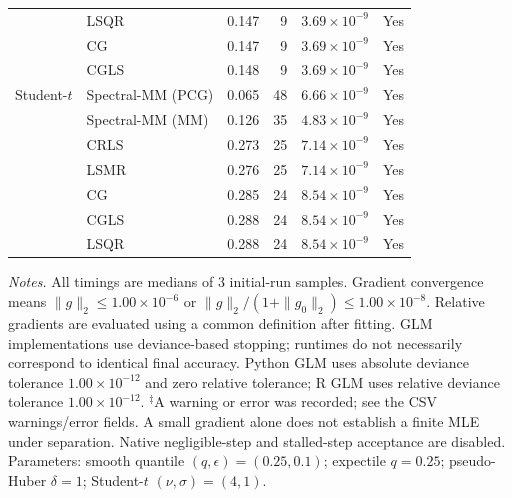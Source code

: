 \begin{longtable}{llrrrc}
 & LSQR & 0.147 & 9 & $3.69\times10^{-9}$ & Yes \\
 & CG & 0.147 & 9 & $3.69\times10^{-9}$ & Yes \\
 & CGLS & 0.148 & 9 & $3.69\times10^{-9}$ & Yes \\
\midrule
Student-$t$ & Spectral-MM (PCG) & 0.065 & 48 & $6.66\times10^{-9}$ & Yes \\
 & Spectral-MM (MM) & 0.126 & 35 & $4.83\times10^{-9}$ & Yes \\
 & CRLS & 0.273 & 25 & $7.14\times10^{-9}$ & Yes \\
 & LSMR & 0.276 & 25 & $7.14\times10^{-9}$ & Yes \\
 & CG & 0.285 & 24 & $8.54\times10^{-9}$ & Yes \\
 & CGLS & 0.288 & 24 & $8.54\times10^{-9}$ & Yes \\
 & LSQR & 0.288 & 24 & $8.54\times10^{-9}$ & Yes \\
\end{longtable}
\noindent\textit{Notes.} All timings are medians of 3 initial-run samples.
Gradient convergence means $\|g\|_2\leq 1.00\times10^{-6}$ or $\|g\|_2/(1+\|g_0\|_2)\leq 1.00\times10^{-8}$.
Relative gradients are evaluated using a common definition after fitting. GLM implementations use deviance-based stopping; runtimes do not necessarily correspond to identical final accuracy.
Python GLM uses absolute deviance tolerance $1.00\times10^{-12}$ and zero relative tolerance; R GLM uses relative deviance tolerance $1.00\times10^{-12}$.
$^{\ddagger}$A warning or error was recorded; see the CSV warnings/error fields. A small gradient alone does not establish a finite MLE under separation.
Native negligible-step and stalled-step acceptance are disabled.
Parameters: smooth quantile $(q,\epsilon)=(0.25,0.1)$; expectile $q=0.25$; pseudo-Huber $\delta=1$; Student-$t$ $(\nu,\sigma)=(4,1)$.
\par
\endgroup
